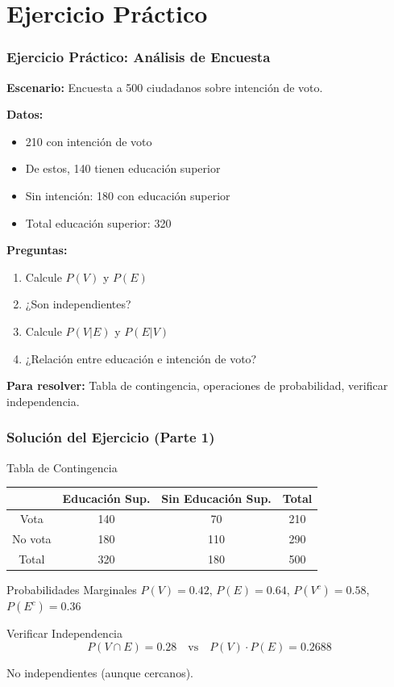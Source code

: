 \documentclass[aspectratio=169,11pt]{beamer}
\begin{document}
\section{Ejercicio Práctico}

\begin{frame}[fragile]
\frametitle{Ejercicio Práctico: Análisis de Encuesta}

\small

\textbf{Escenario:} Encuesta a 500 ciudadanos sobre intención de voto.

\pause
\vspace{0.1cm}
\textbf{Datos:}
\begin{itemize}
  \item 210 con intención de voto
  \item De estos, 140 tienen educación superior
  \item Sin intención: 180 con educación superior
  \item Total educación superior: 320
\end{itemize}

\pause
\vspace{0.15cm}
\textbf{Preguntas:}
\begin{enumerate}
  \item Calcule $P(V)$ y $P(E)$
  \item ¿Son independientes?
  \item Calcule $P(V|E)$ y $P(E|V)$
  \item ¿Relación entre educación e intención de voto?
\end{enumerate}

\pause
\vspace{0.1cm}
\textbf{Para resolver:} Tabla de contingencia, operaciones de probabilidad, verificar independencia.
\end{frame}

\begin{frame}[fragile]
\frametitle{Solución del Ejercicio (Parte 1)}

\small

\begin{block}{Tabla de Contingencia}
\centering
\tiny
\begin{tabular}{c|cc|c}
& Educación Sup. & Sin Educación Sup. & Total \\
\hline
Vota & 140 & 70 & 210 \\
No vota & 180 & 110 & 290 \\
\hline
Total & 320 & 180 & 500 \\
\end{tabular}
\end{block}

\pause
\vspace{0.2cm}
\begin{block}{Probabilidades Marginales}
$P(V) = 0.42$, $P(E) = 0.64$, $P(V^c) = 0.58$, $P(E^c) = 0.36$
\end{block}

\pause
\begin{block}{Verificar Independencia}
$$P(V \cap E) = 0.28 \quad \text{vs} \quad P(V) \cdot P(E) = 0.2688$$

No independientes (aunque cercanos).
\end{block}
\end{frame}
\end{document}
